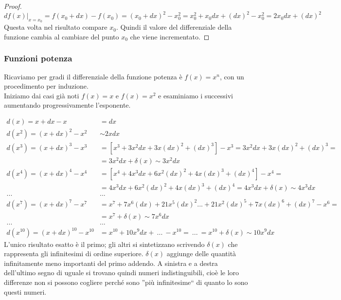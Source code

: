 \begin{proof}
\[
 df(x)|_{x=x_0}= 
f(x_0+dx)-f(x_0)=(x_0+dx)^2-x_0^2=x_0^2+x_0dx+(dx)^2-x_0^2=2x_0dx+(dx)^2
\]
Questa volta nel risultato compare $x_0$. Quindi il valore del differenziale 
della funzione cambia al cambiare del punto $x_0$ che viene incrementato.
\end{proof}

\subsubsection{Funzioni potenza}
\label{subsubsec:diff01_diffpot}
Ricaviamo per gradi il differenziale della funzione potenza è $f(x)=x^n$, con
un procedimento per induzione.\\
Iniziamo dai casi già noti $f(x)=x$ e $f(x)=x^2$ e esaminiamo i successivi
aumentando progressivamente l'esponente.

\begin{align*}
  d(x)=x+dx-x & =dx\\
  d(x^2)=(x+dx)^2-x^2 & \sim 2xdx\\
  d(x^3)=(x+dx)^3-x^3 & =[x^3+3x^2dx+3x(dx)^2+(dx)^3]-x^3=
                      3x^2dx+3x(dx)^2+(dx)^3=\\
                      &= 3x^2dx+\delta(x)\sim 3x^2dx\\
  d(x^4)=(x+dx)^4-x^4 & = [x^4+4x^3dx+6x^2(dx)^2+4x(dx)^3+(dx)^4]-x^4=\\
                      &=4x^3dx+6x^2(dx)^2+4x(dx)^3+(dx)^4=
                      4x^3dx+\delta(x)\sim 4x^3dx\\
  ...                 & ...\\
  d(x^7)=(x+dx)^7-x^7 & = 
x^7+7x^6(dx)+21x^5(dx)^2...+21x^2(dx)^5+7x(dx)^6+(dx)^7 - x^6=\\
  & = x^7+\delta(x)\sim 7x^6dx\\
  ...                 & ...\\
  d(x^{10})=(x+dx)^{10}-x^{10} & =x^{10}+10 x^9dx+\ ...\ -x^{10}=
  \ ...\ =x^{10} +\delta(x)\sim 10 x^9dx      
\end{align*}
L'unico risultato esatto è il primo; gli altri si sintetizzano scrivendo 
$\delta(x)$
che rappresenta gli infinitesimi di ordine superiore. $\delta(x)$ aggiunge
delle quantità infinitamente meno importanti del primo addendo.
A sinistra e a destra dell'ultimo segno di uguale si trovano quindi 
numeri indistinguibili, cioè le loro differenze non si possono cogliere perché
sono ''più infinitesime`` di quanto lo sono questi numeri.\\

